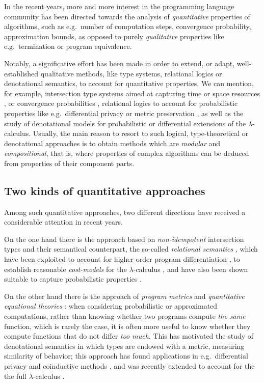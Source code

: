 In the recent years, more and more interest in the programming language community has been directed towards the analysis of \emph{quantitative} properties of algorithms, such as e.g.~number of computation steps, convergence probability, 
approximation bounds, 
as opposed to purely \emph{qualitative} properties like e.g.~termination or program equivalence. 

Notably, a significative effort has been made in order to extend, or adapt, well-established qualitative methods, like type systems, relational logics or denotational semantics, to account for quantitative properties. We can mention, for example, 
intersection type systems aimed at capturing time or space resources \cite{Beniamino}, or convergence probabilities \cite{UgoBreuvart, LICS2022},  relational logics to account for probabilistic properties like e.g.~differential privacy \cite{Barthes} or metric preservation \cite{Reed2010, dallago}, as well as the study of denotational models for 
probabilistic \cite{PCOH, QBS} or differential \cite{difflambda} extensions of the $\lambda$-calculus. 
Usually, the main reason to resort to such logical, type-theoretical or denotational approaches is to obtain methods which are \emph{modular} and \emph{compositional}, that is, where properties of complex algorithms can be deduced from properties of their component parts.   

\subsection{Two kinds of quantitative approaches}

Among such quantitative approaches, two different directions have received a considerable attention in recent years. 

On the one hand there is the approach based on \emph{non-idempotent} intersection types \cite{} and their semantical counterpart, the so-called \emph{relational semantics} \cite{}, which have been exploited to account for higher-order program differentiation \cite{difflambda}, to establish reasonable \emph{cost-models} for the $\lambda$-calculus \cite{}, and have also been shown suitable to capture probabilistic properties \cite{Manzo}. 

On the other hand there is the approach of \emph{program metrics} \cite{} and \emph{quantitative equational theories} \cite{Mardare}: when considering probabilistic or approximated computations, rather than knowing whether two programs compute \emph{the same} function, which is rarely the case, it is often more useful to know whether they compute functions that do not differ \emph{too much}. This has motivated the study of denotational semantics in which types are endowed with a metric, measuring similarity of behavior; this approach has found  applications in e.g.~differential privacy \cite{} and coinductive methods \cite{}, and was recently extended to account for the the full $\lambda$-calculus \cite{LICS2021, FSCD2022}.

